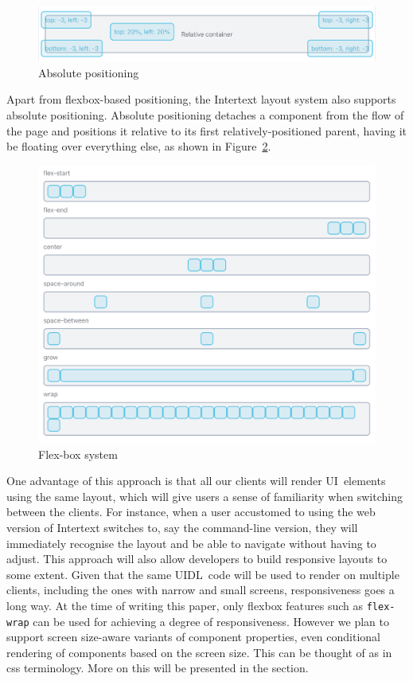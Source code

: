 \begin{figure}[H]
  \centering
  \includegraphics[width=13cm]{thesis/paper/images/absolute.png}
  \caption{Absolute positioning}%
  \label{fig:flexbox_props}%
\end{figure}

Apart from flexbox-based positioning, the Intertext layout system also supports absolute positioning. Absolute positioning detaches a component from the flow of the page and positions it relative to its first relatively-positioned parent, having it be floating over everything else, as shown in Figure~\ref{fig:absolute_positioning}.

\begin{figure}[htb]
  \centering
  \includegraphics[width=13cm]{thesis/paper/images/responsive.png}
  \caption{Flex-box system}%
  \label{fig:absolute_positioning}%
\end{figure}

One advantage of this approach is that all our clients will render UI~elements using the same layout, which will give users a sense of familiarity when switching between the clients. For instance, when a user accustomed to using the web version of Intertext switches to, say the command-line version, they will immediately recognise the layout and be able to navigate without having to adjust. This approach will also allow developers to build responsive layouts to some extent. Given that the same UIDL~code will be used to render on multiple clients, including the ones with narrow and small screens, responsiveness goes a long way. At the time of writing this paper, only flexbox features such as \texttt{flex-wrap} can be used for achieving a degree of responsiveness. However we plan to support screen size-aware variants of component properties, even conditional rendering of components based on the screen size. This can be thought of as  in css terminology. More on this will be presented in the  section.

